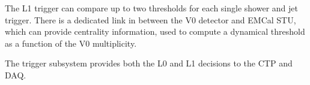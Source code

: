 The L1 trigger can compare up to two thresholds for each single shower and jet trigger. There is a dedicated link in between the V0 detector and EMCal STU, which can provide centrality information, used to compute a dynamical threshold as a function of the V0 multiplicity.

The trigger subsystem provides both the L0 and L1 decisions to the CTP and DAQ. 
%
